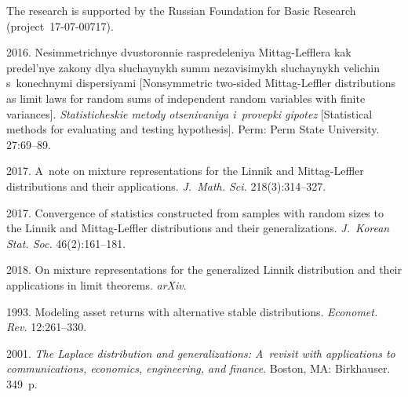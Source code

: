 \vspace*{-20pt}

\Ack
\noindent
The research is supported by the Russian Foundation for Basic Research 
(project~17-07-00717).



  \begin{multicols}{2}

\renewcommand{\bibname}{\protect\rmfamily References}

{\small\frenchspacing
 {%
 \begin{thebibliography}{99}
 2016. Nesimmetrichnye dvustoronnie raspredeleniya Mittag-Lefflera 
 kak predel'nye zakony dlya sluchaynykh summ nezavisimykh sluchaynykh 
 velichin s~konechnymi dispersiyami [Nonsymmetric two-sided Mittag-Leffler 
 distributions as limit laws for random sums of independent random variables 
 with finite variances]. \textit{Statisticheskie metody otsenivaniya i~provepki gipotez}
 [Statistical methods for evaluating and testing hypothesis].
 Perm: Perm State University. 
 27:69--89. %

 2017. A~note on mixture
representations for the Linnik and Mittag-Leffler distributions and 
their applications. \textit{J.~Math. Sci.} 218(3):314--327.

 2017. Convergence of statistics 
constructed from samples with random sizes to the Linnik and Mittag-Leffler 
distributions and their generalizations. \textit{J.~Korean Stat. Soc.} 
46(2):161--181.

 2018. 
On mixture representations for the generalized Linnik distribution and their
applications in limit theorems. \textit{arXiv}.

1993. Modeling asset returns with alternative stable distributions. 
\textit{Economet. Rev.} 12:261--330.

 2001.
\textit{The Laplace
distribution and generalizations: A~revisit with applications to communications, 
economics, engineering, and finance}. Boston, MA: Birkhauser. 349~p.


\end{thebibliography}}}
\end{multicols}
